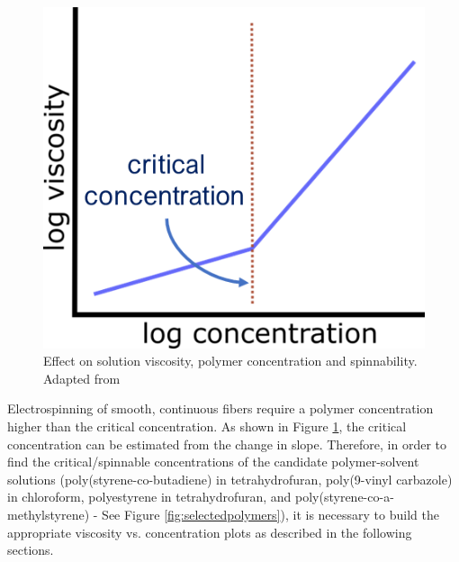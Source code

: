 \begin{figure}[!th]
\centering
\includegraphics[scale=0.45]{./Figures/concentrationViscosityPlotExplained.png}
\decoRule
\caption[Effect on Solution Viscosity and Related Electrospinning Capability]{Effect on solution viscosity, polymer concentration and spinnability. Adapted from \cite{Burghelea2020, Gupta2005, Han2019}}
\label{fig:concentrationViscosityPlotExplained}
\end{figure}

Electrospinning of smooth, continuous fibers require a polymer concentration higher than the critical concentration. As shown in Figure \ref{fig:concentrationViscosityPlotExplained}, the critical concentration can be estimated from the change in slope. \cite{Burghelea2020, Gupta2005, Han2019} Therefore, in order to find the critical/spinnable concentrations of the candidate polymer-solvent solutions (poly(styrene-co-butadiene) in tetrahydrofuran, poly(9-vinyl carbazole) in chloroform, polyestyrene in tetrahydrofuran, and poly(styrene-co-a-methylstyrene) - See Figure \ref{fig:selectedpolymers}), it is necessary to build the appropriate viscosity vs. concentration plots as described in the following sections.

